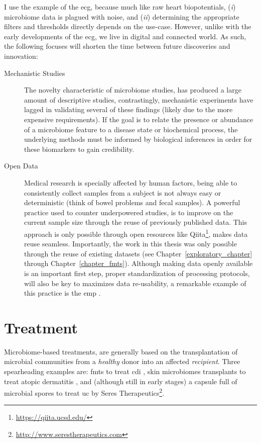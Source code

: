 I use the example of the \gls{ecg}, because much like raw heart biopotentials,
(\textit{i}) microbiome data is plagued with noise, and (\textit{ii})
determining the appropriate filters and thresholds directly depends on the
use-case. However, unlike with the early developments of the \gls{ecg}, we live
in digital and connected world. As such, the following focuses will
shorten the time between future discoveries and innovation:

\begin{description}
    \item[Mechanistic Studies]The novelty characteristic of microbiome studies, 
        has produced a large amount of descriptive studies, contrastingly, 
        mechanistic experiments have lagged in validating several of these 
        findings (likely due to the more expensive requirements).  If the goal 
        is to relate the presence or abundance of a microbiome feature to a
        disease state or biochemical process, the underlying methods must be 
        informed by biological inferences in order for these biomarkers to gain 
        credibility.

    \item[Open Data]Medical research is specially affected by human factors, 
        being able to consistently collect samples from a subject is not always 
        easy or deterministic (think of bowel problems and fecal samples). A 
        powerful practice used to counter underpowered studies, is to improve 
        on the current sample size through the reuse of previously published 
        data. This approach is only possible through open resources like 
        Qiita\footnote{\url{https://qiita.ucsd.edu/}}, makes data reuse 
        seamless. Importantly, the work in this thesis was only possible 
        through the reuse of existing datasets (see 
        Chapter~\ref{exploratory_chapter} through Chapter~\ref{chapter_fmts}).  
        Although making data openly available is an important first step, 
        proper standardization of processing protocols, will also be key to 
        maximizes data re-usability, a remarkable example of this practice is 
        the \gls{emp} \cite{RN4267}.
\end{description}

\section{Treatment}

Microbiome\hyp{}based treatments, are generally based on the transplantation of 
microbial communities from a \textit{healthy} donor into an affected 
\textit{recipient}. Three spearheading examples are: \glspl{fmt} to treat 
\gls{cdi} \cite{RN4129}, skin microbiomes transplants to treat atopic 
dermatitis \cite{GalloSkin}, and (although still in early stages) a capsule 
full of microbial spores to treat \gls{uc} by Seres 
Therapeutics\footnote{\url{http://www.serestherapeutics.com}}.

